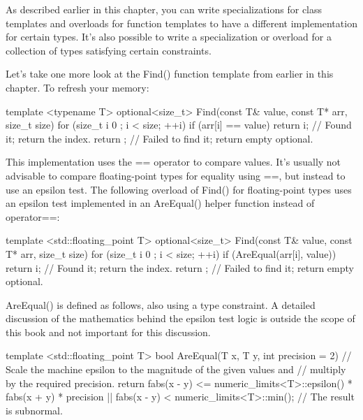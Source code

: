 
As described earlier in this chapter, you can write specializations for class templates and overloads for function templates to have a different implementation for certain types. It’s also possible to write a specialization or overload for a collection of types satisfying certain constraints.

Let’s take one more look at the Find() function template from earlier in this chapter. To refresh your memory:

\begin{cpp}
template <typename T>
optional<size_t> Find(const T& value, const T* arr, size_t size)
{
    for (size_t i { 0 }; i < size; ++i) {
        if (arr[i] == value) {
            return i; // Found it; return the index.
            }
        }
    return {}; // Failed to find it; return empty optional.
}
\end{cpp}

This implementation uses the == operator to compare values. It’s usually not advisable to compare floating-point types for equality using ==, but instead to use an epsilon test. The following overload of Find() for floating-point types uses an epsilon test implemented in an AreEqual() helper function instead of operator==:

\begin{cpp}
template <std::floating_point T>
optional<size_t> Find(const T& value, const T* arr, size_t size)
{
    for (size_t i { 0 }; i < size; ++i) {
        if (AreEqual(arr[i], value)) {
            return i; // Found it; return the index.
        }
    }
    return {}; // Failed to find it; return empty optional.
}
\end{cpp}

AreEqual() is defined as follows, also using a type constraint. A detailed discussion of the mathematics behind the epsilon test logic is outside the scope of this book and not important for this discussion.

\begin{cpp}
template <std::floating_point T>
bool AreEqual(T x, T y, int precision = 2)
{
    // Scale the machine epsilon to the magnitude of the given values and
    // multiply by the required precision.
    return fabs(x - y) <= numeric_limits<T>::epsilon() * fabs(x + y) * precision
        || fabs(x - y) < numeric_limits<T>::min(); // The result is subnormal.
}
\end{cpp}

